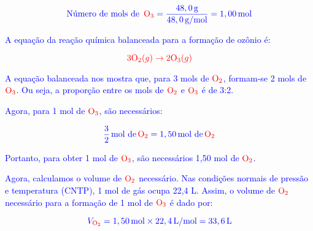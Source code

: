 \documentclass[a4paper, 12pt]{article}
\begin{document}
\begin{enumerate}
          \[
              \textcolor{blue}{\text{Número de mols de } \, \textcolor{red}{\text{O}_3} = \frac{48,0 \, \text{g}}{48,0 \, \text{g/mol}} = 1,00 \, \text{mol}}
          \]

          \textcolor{blue}{A equação da reação química balanceada para a formação de ozônio é:}

          \[
              \textcolor{blue}{\textcolor{red}{3\text{O}_2(g) \rightarrow 2\text{O}_3(g)}}
          \]

          \textcolor{blue}{A equação balanceada nos mostra que, para 3 mols de $\textcolor{red}{\text{O}_2}$, formam-se 2 mols de $\textcolor{red}{\text{O}_3}$. Ou seja, a proporção entre os mols de $\textcolor{red}{\text{O}_2}$ e $\textcolor{red}{\text{O}_3}$ é de 3:2.}

          \textcolor{blue}{Agora, para 1 mol de $\textcolor{red}{\text{O}_3}$, são necessários:}

          \[
              \textcolor{blue}{\frac{3}{2} \, \text{mol de} \, \textcolor{red}{\text{O}_2} = 1,50 \, \text{mol de} \, \textcolor{red}{\text{O}_2}}
          \]

          \textcolor{blue}{Portanto, para obter 1 mol de $\textcolor{red}{\text{O}_3}$, são necessários 1,50 mol de $\textcolor{red}{\text{O}_2}$.}

          \textcolor{blue}{Agora, calculamos o volume de $\textcolor{red}{\text{O}_2}$ necessário. Nas condições normais de pressão e temperatura (CNTP), 1 mol de gás ocupa 22,4 L. Assim, o volume de $\textcolor{red}{\text{O}_2}$ necessário para a formação de 1 mol de $\textcolor{red}{\text{O}_3}$ é dado por:}

          \[
              \textcolor{blue}{V_{\textcolor{red}{\text{O}_2}} = 1,50 \, \text{mol} \times 22,4 \, \text{L/mol} = 33,6 \, \text{L}}
          \]



\end{enumerate}
\end{document}
